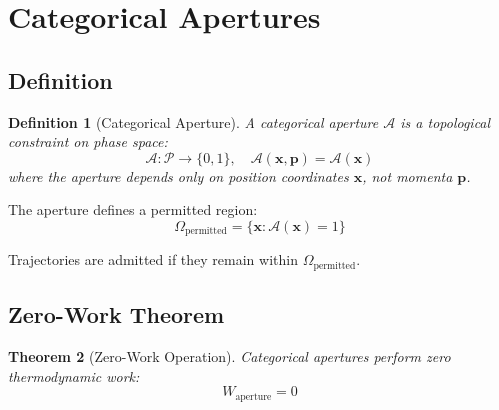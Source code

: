 \documentclass[twocolumn,amsmath,amssymb,aps,prl,superscriptaddress]{revtex4-2}
\newtheorem{theorem}{Theorem}[section]
\newtheorem{definition}[theorem]{Definition}
\newcommand{\Pspace}{\mathcal{P}}
\newcommand{\Apert}{\mathcal{A}}
\newcommand{\Wapert}{W_{\text{aperture}}}
\begin{document}
\section{Categorical Apertures}
\label{sec:aperture}

\subsection{Definition}

\begin{definition}[Categorical Aperture]
\label{def:aperture}
A categorical aperture $\Apert$ is a topological constraint on phase space:
\begin{equation}
\Apert: \Pspace \to \{0, 1\}, \quad \Apert(\mathbf{x}, \mathbf{p}) = \Apert(\mathbf{x})
\end{equation}
where the aperture depends \emph{only} on position coordinates $\mathbf{x}$, not momenta $\mathbf{p}$.
\end{definition}

The aperture defines a permitted region:
\begin{equation}
\Omega_{\text{permitted}} = \{\mathbf{x} : \Apert(\mathbf{x}) = 1\}
\end{equation}

Trajectories are admitted if they remain within $\Omega_{\text{permitted}}$.

\subsection{Zero-Work Theorem}

\begin{theorem}[Zero-Work Operation]
\label{thm:zerowork}
Categorical apertures perform zero thermodynamic work:
\begin{equation}
\boxed{\Wapert = 0}
\end{equation}
\end{theorem}
\end{document}
